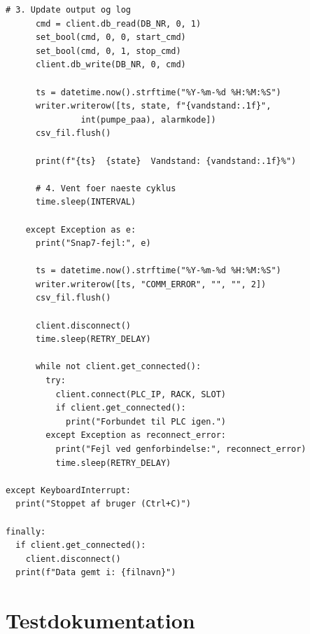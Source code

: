 \documentclass[12pt, a4paper]{article}
\begin{document}
\vspace{0.3cm}

\begin{tcolorbox}[codebox,
  title={\faPython\quad \texttt{vandstand.py} \textnormal{\textcolor{white!60!siemensblue}{\small --- del 4/4: update output, log og fejlhaandtering}}}]
\begin{lstlisting}[style=python, firstnumber=77]
      # 3. Update output og log
      cmd = client.db_read(DB_NR, 0, 1)
      set_bool(cmd, 0, 0, start_cmd)
      set_bool(cmd, 0, 1, stop_cmd)
      client.db_write(DB_NR, 0, cmd)

      ts = datetime.now().strftime("%Y-%m-%d %H:%M:%S")
      writer.writerow([ts, state, f"{vandstand:.1f}",
               int(pumpe_paa), alarmkode])
      csv_fil.flush()

      print(f"{ts}  {state}  Vandstand: {vandstand:.1f}%")

      # 4. Vent foer naeste cyklus
      time.sleep(INTERVAL)

    except Exception as e:
      print("Snap7-fejl:", e)

      ts = datetime.now().strftime("%Y-%m-%d %H:%M:%S")
      writer.writerow([ts, "COMM_ERROR", "", "", 2])
      csv_fil.flush()

      client.disconnect()
      time.sleep(RETRY_DELAY)

      while not client.get_connected():
        try:
          client.connect(PLC_IP, RACK, SLOT)
          if client.get_connected():
            print("Forbundet til PLC igen.")
        except Exception as reconnect_error:
          print("Fejl ved genforbindelse:", reconnect_error)
          time.sleep(RETRY_DELAY)

except KeyboardInterrupt:
  print("Stoppet af bruger (Ctrl+C)")

finally:
  if client.get_connected():
    client.disconnect()
  print(f"Data gemt i: {filnavn}")
\end{lstlisting}
\end{tcolorbox}
\clearpage

\section{Testdokumentation}
\end{document}
